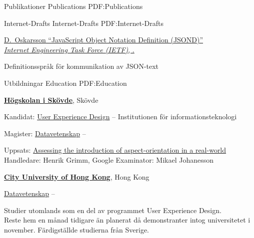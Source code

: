 \documentclass[letterpaper,MMMyyyy,nonstopmode]{resume}
\begin{document}
\begin{Body}
\Section
{Publikationer}
{Publications}
{PDF:Publications}

\SubSection
{Internet-Drafts}
{Internet-Drafts}
{PDF:Internet-Drafts}

\begingroup
\renewcommand{\MaxNumberedItem}{[88]}

\BigGap
\BulletItem
\href{https://www.ietf.org/archive/id/draft-oskarsson-jsond-00.txt}
{\underline{D.~Oskarsson}
``JavaScript Object Notation Definition (JSOND)''\\
\textit{Internet Engineering Task Force (IETF)}, .}
\begin{Detail}
\Item
Definitionsspråk för kommunikation av JSON-text
\end{Detail}
  
\endgroup


\Section
{Utbildningar}
{Education}
{PDF:Education}

\Entry
\href{http://www.example.com/my-university}
{\textbf{Högskolan i Skövde}},
Skövde

\Gap
\BulletItem
Kandidat:
\href{http://www.his.se/uxd}
{User Experience Design}
\hfill
{} --
\newline
Institutionen för informationsteknologi



\Gap
\BulletItem
Magister:
\href{http://his.se/dvp}
{Datavetenskap}
\hfill
{} --
\begin{Detail}
\SubBulletItem
Uppsats:
\href{http://urn.kb.se/resolve?urn=urn:nbn:se:his:diva-13461}
{Assessing the introduction of aspect-orientation in a real-world}
\SubBulletItem
Handledare:
Henrik Grimm, Google
\SubBulletItem
Examinator:
Mikael Johanesson
\end{Detail}
    
\BigGap
\Entry
\href{http://cityu.edu.hk}
{\textbf{City University of Hong Kong}}, Hong Kong

\Gap
\BulletItem
\href{https://cs.cityu.edu.hk/courses/exchange.html}
{Datavetenskap}
\hfill
{} --
\begin{Detail}
\SubBulletItem
Studier utomlands som en del av programmet User Experience Design.\\Reste hem en månad tidigare än planerat då demonstranter intog universitetet i november. Färdigställde studierna från Sverige.\end{Detail}


\end{Body}
\end{document}
